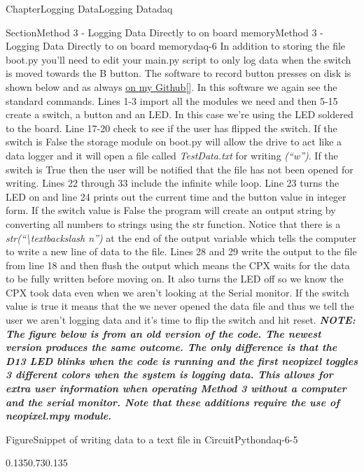\documentclass[oneside,10pt,]{book}
\newcommand{\xreffont}{\relax}
\newcommand{\linkhilite}[1]{\underline{#1}}
\newcommand{\alert}[1]{\textbf{\textit{#1}}}
\numberwithin{equation}{section}
\begin{document}
\begin{chapterptx}{Chapter}{Logging Data}{}{Logging Data}{}{}{daq}
\begin{sectionptx}{Section}{Method 3 - Logging Data Directly to on board memory}{}{Method 3 - Logging Data Directly to on board memory}{}{}{daq-6}
In addition to storing the file boot.py you'll need to edit your main.py script to only log data when the switch is moved towards the B button. The software to record button presses on disk is shown below and as always \href{https://github.com/cmontalvo251/Microcontrollers/blob/master/Circuit_Playground/CircuitPython/Data_Logging/write_button_presses_disk.py}{\linkhilite{on my Github}}\hyperlink{Github}{\linkhilite{[{\xreffont 33}]}}. In this software we again see the standard commands. Lines 1-3 import all the modules we need and then 5-15 create a switch, a button and an LED. In this case we're using the LED soldered to the board. Line 17-20 check to see if the user has flipped the switch. If the switch is False the storage module on boot.py will allow the drive to act like a data logger and it will open a file called \emph{Test\textunderscore{}Data.txt} for writing \emph{(\textquotedblleft{}w\textquotedblright{})}. If the switch is True then the user will be notified that the file has not been opened for writing. Lines 22 through 33 include the infinite while loop. Line 23 turns the LED on and line 24 prints out the current time and the button value in integer form. If the switch value is False the program will create an output string by converting all numbers to strings using the str function. Notice that there is a \emph{str(\textquotedblleft{}\textbackslash{}textbackslash n\textquotedblright{})} at the end of the output variable which tells the computer to write a new line of data to the file. Lines 28 and 29 write the output to the file from line 18 and then flush the output which means the CPX waits for the data to be fully written before moving on. It also turns the LED off so we know the CPX took data even when we aren't looking at the Serial monitor. If the switch value is true it means that the we never opened the data file and thus we tell the user we aren't logging data and it's time to flip the switch and hit reset. \alert{NOTE: The figure below is from an old version of the code. The newest version produces the same outcome. The only difference is that the D13 LED blinks when the code is running and the first neopixel toggles 3 different colors when the system is logging data. This allows for extra user information when operating Method 3 without a computer and the serial monitor. Note that these additions require the use of neopixel.mpy module.}%
\begin{figureptx}{Figure}{Snippet of writing data to a text file in CircuitPython}{daq-6-5}{}%
\begin{image}{0.135}{0.73}{0.135}{}%

\end{image}
\end{figureptx}
\end{sectionptx}
\end{chapterptx}
\end{document}
